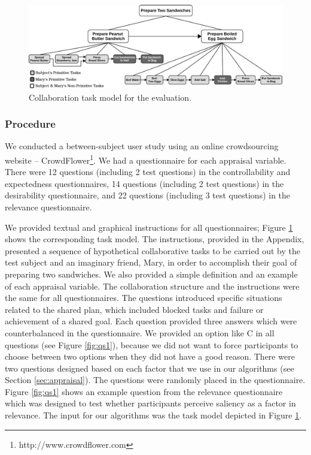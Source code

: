 \documentclass[12pt]{report}
\begin{document}
\begin{figure}[tbh]
  \centering
  \includegraphics[width=1\textwidth]{figure/taskModel-croped.pdf}
  \caption{Collaboration task model for the evaluation.}
  \label{fig:taskModel}
\end{figure}

\subsubsection{Procedure}
 We conducted a between-subject user study using an online crowdsourcing website
 -- CrowdFlower\footnote{http://www.crowdflower.com}. We had a questionnaire for
 each appraisal variable. There were 12 questions (including 2 test questions)
 in the controllability and expectedness questionnaires, 14 questions (including
 2 test questions) in the desirability questionnaire, and 22 questions
 (including 3 test questions) in the relevance questionnaire.
 
We provided textual and graphical instructions for all questionnaires; Figure
\ref{fig:taskModel} shows the corresponding task model. The instructions,
provided in the Appendix, presented a sequence of hypothetical collaborative
tasks to be carried out by the test subject and an imaginary friend, Mary, in order to
accomplish their goal of preparing two sandwiches. We also provided a simple
definition and an example of each appraisal variable. The collaboration
structure and the instructions were the same for all questionnaires. The
questions introduced specific situations related to the shared plan, which
included blocked tasks and failure or achievement of a shared goal. Each
question provided three answers which were counterbalanced in the questionnaire.
We provided an option like C in all questions (see Figure \ref{fig:qs1}),
because we did not want to force participants to choose between two options when
they did not have a good reason. There were two questions designed based on each
factor that we use in our algorithms (see Section \ref{sec:appraisal}). The
questions were randomly placed in the questionnaire. Figure \ref{fig:qs1} shows
an example question from the relevance questionnaire which was designed to test
whether participants perceive saliency as a factor in relevance. The input for
our algorithms was the task model depicted in Figure \ref{fig:taskModel}.
\end{document}
